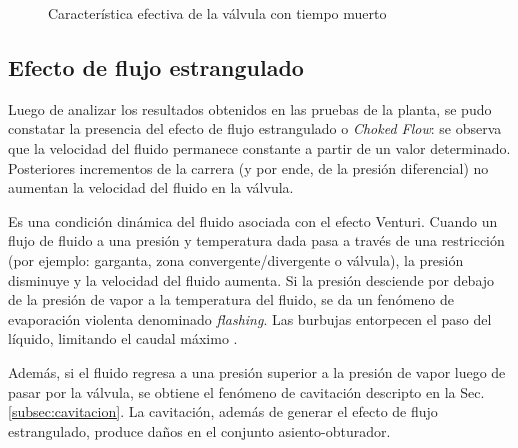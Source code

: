 \begin{figure}[ht]
  \centering
\caption{Característica efectiva de la válvula con tiempo muerto}
\label{fig:valvulaCtiempoMuerto}
\end{figure}

\subsection{Efecto de flujo estrangulado}
\label{subsec:chokedflow}

Luego de analizar los resultados obtenidos en las pruebas de la planta, se pudo
constatar la presencia del efecto de flujo estrangulado o \emph{Choked
Flow}: se observa que la velocidad del fluido permanece constante a partir de
un valor determinado.
Posteriores incrementos de la carrera (y por ende, de la presión diferencial) no
aumentan la velocidad del fluido en la válvula.

Es una condición dinámica del fluido asociada con el efecto Venturi.
Cuando un flujo de fluido a una presión y temperatura dada pasa a través de una
restricción (por ejemplo: garganta, zona convergente/divergente o válvula),
la presión disminuye y la velocidad del fluido aumenta.
Si la presión desciende por debajo de la presión de vapor a la
temperatura del fluido, se da un fenómeno de evaporación violenta denominado
\emph{flashing}.
Las burbujas entorpecen el paso del líquido, limitando el caudal máximo
\cite{bib:controlValveHandbook,bib:ApuntesPuglesiValvulas}.

Además, si el fluido regresa a una presión superior a la presión de vapor luego
de pasar por la válvula, se obtiene el fenómeno de cavitación descripto en la
Sec. \ref{subsec:cavitacion}.
La cavitación, además de generar el efecto de flujo estrangulado, produce daños
en el conjunto asiento-obturador.

